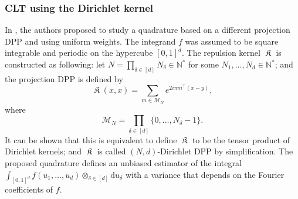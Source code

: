 \documentclass[twoside,11pt]{book}
\DeclareMathOperator{\Tran}{\intercal}
\DeclareMathOperator*{\KDPP}{\mathfrak{K}}
\begin{document}
\subsubsection{CLT using the Dirichlet kernel}
In \citep*{CoMaAm20}, the authors proposed to study a quadrature based on a different projection DPP and using uniform weights. The integrand $f$ was assumed to be square integrable and periodic on the hypercube $[0,1]^{d}$. The repulsion kernel $\KDPP$ is constructed as following: let $N = \prod\limits_{\delta \in [d]}N_{\delta} \in \mathbb{N}^{*}$ for some $N_{1}, \dots, N_{d} \in \mathbb{N}^{*}$; and the projection DPP is defined by
\begin{equation}\label{eq:Dirichlet_kernel}
\KDPP(x,x) = \sum\limits_{m \in \mathcal{M}_{N}}e^{2i \pi m^{\Tran}(x-y) },
\end{equation}
where 
\begin{equation}
\mathcal{M}_{N} = \prod\limits_{\delta \in [d]} \{0, \dots, N_{\delta}-1 \}.
\end{equation}
It can be shown that this is equivalent to define $\KDPP$ to be the tensor product of Dirichlet kernels; and $\KDPP$ is called $(N,d)$-Dirichlet DPP by simplification. 
The proposed quadrature defines an unbiased estimator of the integral $\displaystyle \int_{[0,1]^{d}} f(u_{1}, \dots, u_{d}) \otimes_{\delta \in [d]} \mathrm{d}u_{\delta}$ with a variance that depends on the Fourier coefficients of $f$. 
\end{document}

